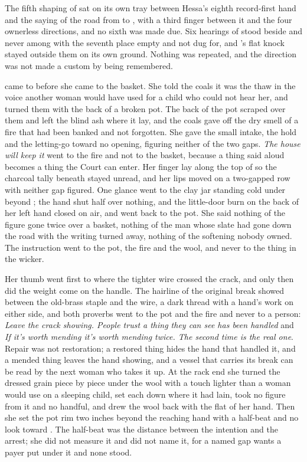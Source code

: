 The fifth shaping of  sat on its own tray between Hessa's eighth record-first hand and the saying of the road from  to , with a third finger between it and the four ownerless directions, and no sixth was made due. Six hearings of  stood beside and never among with the seventh place empty and not dug for, and 's flat knock stayed outside them on its own ground. Nothing was repeated, and the direction was not made a custom by being remembered.

\scenebreak

 came to  before she came to the basket. She told the coals it was the thaw in the voice another woman would have used for a child who could not hear her, and turned them with the back of a broken pot. The back of the pot scraped over them and left the blind ash where it lay, and the coals gave off the dry smell of a fire that had been banked and not forgotten. She gave the small intake, the hold and the letting-go toward no opening, figuring neither of the two gaps. \emph{The house will keep it} went to the fire and not to the basket, because a thing said aloud becomes a thing the Court can enter. Her finger lay along the top of  so the charcoal tally beneath stayed unread, and her lips moved on a two-gapped row with neither gap figured. One glance went to the clay jar standing cold under  beyond ; the hand shut half over nothing, and the little-door burn on the back of her left hand closed on air, and went back to the pot. She said nothing of the figure gone twice over a basket, nothing of the man whose slate had gone down the road with the writing turned away, nothing of the softening nobody owned. The instruction went to the pot, the fire and the wool, and never to the thing in the wicker.

Her thumb went first to where the tighter wire crossed the crack, and only then did the weight come on the handle. The hairline of the original break showed between the old-brass staple and the wire, a dark thread with a hand's work on either side, and both proverbs went to the pot and the fire and never to a person: \emph{Leave the crack showing. People trust a thing they can see has been handled} and \emph{If it's worth mending it's worth mending twice. The second time is the real one}. Repair was not restoration; a restored thing hides the hand that handled it, and a mended thing leaves the hand showing, and a vessel that carries its break can be read by the next woman who takes it up. At the rack end she turned the dressed grain piece by piece under the wool with a touch lighter than a woman would use on a sleeping child, set each down where it had lain, took no figure from it and no handful, and drew the wool back with the flat of her hand. Then she set the pot rim two inches beyond the reaching hand with a half-beat and no look toward . The half-beat was the distance between the intention and the arrest; she did not measure it and did not name it, for a named gap wants a payer put under it and none stood.

